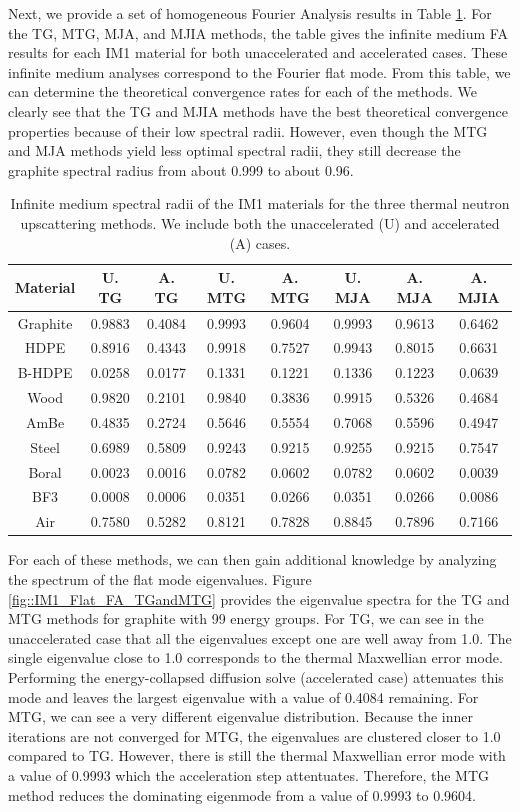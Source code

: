 Next, we provide a set of homogeneous Fourier Analysis results in Table \ref{tab::IM1_inf_med_SR}. For the TG, MTG, MJA, and MJIA methods, the table gives the infinite medium FA results for each IM1 material for both unaccelerated and accelerated cases. These infinite medium analyses correspond to the Fourier flat mode. From this table, we can determine the theoretical convergence rates for each of the methods. We clearly see that the TG and MJIA methods have the best theoretical convergence properties because of their low spectral radii. However, even though the MTG and MJA methods yield less optimal spectral radii, they still decrease the graphite spectral radius from about 0.999 to about 0.96. 

\begin{table}
\caption{Infinite medium spectral radii of the IM1 materials for the three thermal neutron upscattering methods. We include both the unaccelerated (U) and accelerated (A) cases.}
\centering
\def\arraystretch{1.2}
\begin{tabular}{|c||c|c||c|c||c|c|c|}
\hline
Material  & U. TG & A. TG & U. MTG & A. MTG & U. MJA & A. MJA & A. MJIA \\ \hline
Graphite & 0.9883&0.4084&0.9993&0.9604&0.9993&0.9613&0.6462\\
HDPE &0.8916&0.4343&0.9918&0.7527&0.9943&0.8015&0.6631\\
B-HDPE &0.0258&0.0177&0.1331&0.1221&0.1336&0.1223&0.0639 \\
Wood & 0.9820&0.2101&0.9840&0.3836&0.9915&0.5326&0.4684 \\
AmBe  &0.4835&0.2724&0.5646&0.5554&0.7068&0.5596&0.4947 \\
Steel  & 0.6989&0.5809&0.9243&0.9215&0.9255&0.9215&0.7547\\
Boral  & 0.0023&0.0016&0.0782&0.0602&0.0782&0.0602&0.0039 \\
BF3   & 0.0008&0.0006&0.0351&0.0266&0.0351&0.0266&0.0086 \\
Air     &0.7580&0.5282&0.8121&0.7828&0.8845&0.7896&0.7166\\
\hline
\end{tabular}
\label{tab::IM1_inf_med_SR}
\end{table}

For each of these methods, we can then gain additional knowledge by analyzing the spectrum of the flat mode eigenvalues. Figure \ref{fig::IM1_Flat_FA_TGandMTG} provides the eigenvalue spectra for the TG and MTG methods for graphite with 99 energy groups. For TG, we can see in the unaccelerated case that all the eigenvalues except one are well away from 1.0. The single eigenvalue close to 1.0 corresponds to the thermal Maxwellian error mode. Performing the energy-collapsed diffusion solve (accelerated case) attenuates this mode and leaves the largest eigenvalue with a value of 0.4084 remaining. For MTG, we can see a very different eigenvalue distribution. Because the inner iterations are not converged for MTG, the eigenvalues are clustered closer to 1.0 compared to TG. However, there is still the thermal Maxwellian error mode with a value of 0.9993 which the acceleration step attentuates. Therefore, the MTG method reduces the dominating eigenmode from a value of 0.9993 to 0.9604.

